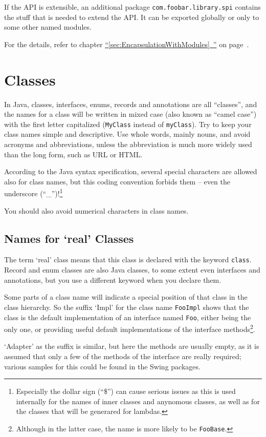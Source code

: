 \documentclass[11pt,a4paper, titlepage, parskip=half, headsepline, footsepline, cleardoublepage=current, headheight=1cm]{scrbook}
\newcommand*{\tqfullvref}[1]{\hyperref[{#1}]{“\ref*{#1}~\nameref*{#1}”} on page~\pageref{#1}}
\begin{document}
If the API is extensible, an additional package \lstinline|com.foobar.library.spi| contains the stuff that is needed to extend the API. It can be exported globally or only to some other named modules.

For the details, refer to chapter \tqfullvref{sec:EncapsulationWithModules}.

\section{Classes}\label{sec:Classes}
In Java, classes, interfaces, enums, records and annotations are all “classes”, and the names for a class will be written in mixed case (also known as “camel case”) with the first letter capitalized (\lstinline|MyClass| instead of \lstinline|myClass|). Try to keep your class names simple and descriptive. Use whole words, mainly nouns, and avoid acronyms and abbreviations, unless the abbreviation is much more widely used than the long form, such as URL or HTML.

According to the Java syntax specification, several special characters are allowed also for class names, but this coding convention forbids them – even the underscore (“\_”)!\footnote{Especially the dollar sign (“\$”) can cause serious issues as this is used internally for the names of inner classes and anynomous classes, as well as for the classes that will be generared for lambdas.}

You should also avoid numerical characters in class names.

\subsection{Names for ‘real’ Classes}\label{sec:NamesForClasses}
The term ‘real’ class means that this class is declared with the keyword \lstinline|class|. Record and enum classes are also Java classes, to some extent even interfaces and annotations, but you use a different keyword when you declare them.

Some parts of a class name will indicate a special position of that class in the class hierarchy. So the suffix ‘Impl’ for the class name \lstinline|FooImpl| shows that the class is the default implementation of an interface named \lstinline|Foo|, either being the only one, or providing useful default implementations of the interface methods\footnote{Although in the latter case, the name is more likely to be \lstinline|FooBase|.}.

‘Adapter’ as the suffix is similar, but here the methods are usually empty, as it is assumed that only a few of the methods of the interface are really required; various samples for this could be found in the Swing packages.
\end{document}
